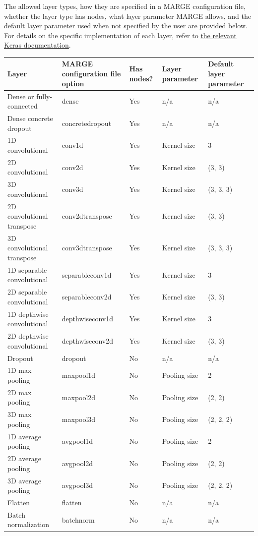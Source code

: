 \documentclass[letterpaper, 12pt]{article}
\begin{document}
The allowed layer types, how they are specified in a MARGE configuration 
file, whether the layer type has nodes, what layer parameter MARGE allows, and 
the default layer parameter used when not specified by the user are provided 
below.  For details on the specific implementation of each layer, refer to 
\href{https://keras.io/api/layers/}{the relevant Keras documentation}.

\begin{center}
	\begin{tabular}{| l | l | l | l | l |}
		\hline
		Layer & MARGE configuration file option & Has nodes? & Layer parameter & Default layer parameter \\
		\hline\hline
		Dense or fully-connected & dense & Yes & n/a  & n/a\\
		Dense concrete dropout & concretedropout & Yes & n/a & n/a \\
		1D convolutional & conv1d & Yes &  Kernel size & 3 \\
		2D convolutional & conv2d & Yes &  Kernel size & (3, 3) \\
		3D convolutional & conv3d & Yes &  Kernel size & (3, 3, 3) \\
		2D convolutional transpose & conv2dtranspose & Yes &  Kernel size & (3, 3) \\
		3D convolutional transpose & conv3dtranspose & Yes &  Kernel size & (3, 3, 3) \\
		1D separable convolutional & separableconv1d & Yes &  Kernel size & 3 \\
		2D separable convolutional & separableconv2d & Yes &  Kernel size & (3, 3) \\
		1D depthwise convolutional & depthwiseconv1d & Yes &  Kernel size & 3 \\
		2D depthwise convolutional & depthwiseconv2d & Yes &  Kernel size & (3, 3) \\
		Dropout & dropout & No & n/a & n/a \\
		1D max pooling & maxpool1d & No & Pooling size & 2 \\
		2D max pooling & maxpool2d & No & Pooling size & (2, 2) \\
		3D max pooling & maxpool3d & No & Pooling size & (2, 2, 2) \\
		1D average pooling & avgpool1d & No & Pooling size & 2 \\
		2D average pooling & avgpool2d & No & Pooling size & (2, 2) \\
		3D average pooling & avgpool3d & No & Pooling size & (2, 2, 2) \\
		Flatten & flatten & No & n/a & n/a \\
		Batch normalization & batchnorm & No & n/a & n/a \\
		\hline
	\end{tabular}
\end{center}
\end{document}
